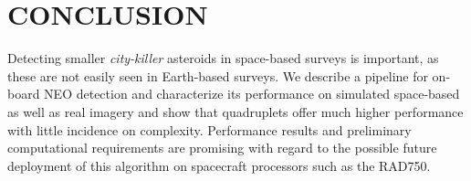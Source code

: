 \documentclass{article}
\begin{document}
\vspace{-0.3cm}
\vspace{-0.3cm}


\vspace{-0.3cm}
\section{CONCLUSION}
Detecting smaller {\em city-killer} asteroids in space-based surveys is important, as these  are not easily seen in Earth-based surveys. We describe a pipeline for on-board NEO detection and characterize its performance on simulated space-based as well as real imagery and show that quadruplets offer much higher performance with little incidence on complexity. Performance results and preliminary computational requirements are promising with regard to the possible future deployment of this algorithm on spacecraft processors such as the RAD750. 
\end{document}
